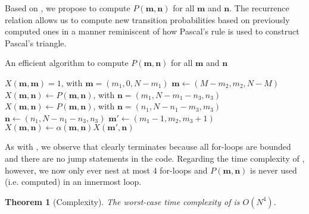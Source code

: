 \documentclass[a4paper,preprint]{elsarticle}
\newtheorem{theorem}{Theorem}
\renewcommand{\vec}[1]{\boldsymbol{#1}}
\begin{document}
Based on , we propose  to compute $P(\vec{m},\vec{n})$ for all $\vec{m}$ and $\vec{n}$. The recurrence relation allows us to compute new transition probabilities based on previously computed ones in a manner reminiscent of how Pascal's rule is used to construct Pascal's triangle.

\begin{algorithm}[t]
    \caption{An efficient algorithm to compute $P(\vec{m},\vec{n})$ for all $\vec{m}$ and $\vec{n}$}
    \label{alg:probs}
    \begin{algorithmic}[1]
            \State $X(\vec{m},\vec{m}) = 1$, with $\vec{m} = (m_1,0,N-m_1)$
        \EndFor
              \State $\vec{m} \gets (M - m_2,m_2,N-M)$
               
                \State $X(\vec{m},\vec{n}) \gets P(\vec{m},\vec{n})$, with $\vec{n}=(m_1,N-m_1-n_3,n_3)$\label{loc:fixn1}
              \EndFor
               
                \State $X(\vec{m},\vec{n}) \gets P(\vec{m},\vec{n})$, with $\vec{n}=(n_1,N-n_1-m_3,m_3)$\label{loc:fixn3}
              \EndFor
              \label{loc:reccomp-start}
                     \State $\vec{n} \gets (n_1,N-n_1-n_3,n_3)$
                     \State $\vec{m'} \gets (m_1-1,m_2,m_3+1)$
                     \State $X(\vec{m},\vec{n}) \gets \alpha(\vec{m},\vec{n})X(\vec{m'},\vec{n})$
                  \EndFor
              \EndFor\label{loc:reccomp-end}
          \EndFor
      \EndFor
    \end{algorithmic}
\end{algorithm}

As with , we observe that  clearly terminates because all for-loops are bounded and there are no jump statements in the code. Regarding the time complexity of , however, we now only ever nest at most $4$ for-loops and $P(\vec{m},\vec{n})$ is never used (i.e. computed) in an innermost loop.
\begin{theorem}[Complexity]
    The worst-case time complexity of  is $O(N^4)$.
\end{theorem}
\end{document}

